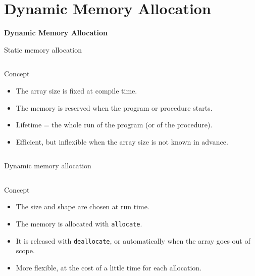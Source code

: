 
\subtitle{Lecture 5: Dynamic Memory and Pointers}



\begin{frame}
  \titlepage
\end{frame}

\section{Dynamic Memory Allocation}

\begin{frame}
	\centering
	\Huge \textbf{Dynamic Memory Allocation}
\end{frame}


\begin{frame}[fragile]{Static memory allocation}
  \begin{columns}[T]
    \begin{block}{Concept}
      \begin{itemize}
        \item The array size is fixed at compile time.
        \item The memory is reserved when the program or procedure starts.
        \item Lifetime = the whole run of the program (or of the procedure).
        \item Efficient, but inflexible when the array size is not known in advance.
      \end{itemize}
    \end{block}
    
  \end{columns}
\end{frame}


\begin{frame}[fragile]{Dynamic memory allocation}
  \begin{columns}[T]
    \begin{block}{Concept}
      \begin{itemize}
        \item The size and shape are chosen at run time.
        \item The memory is allocated with \texttt{allocate}.
        \item It is released with \texttt{deallocate}, or automatically when the array goes out of scope.
        \item More flexible, at the cost of a little time for each allocation.
      \end{itemize}
    \end{block}
    
  \end{columns}
\end{frame}


